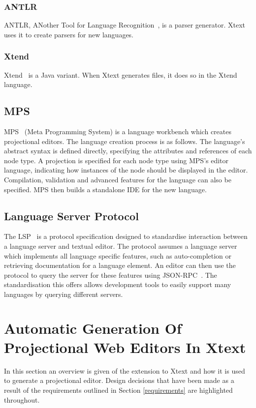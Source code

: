 \documentclass{article}
\begin{document}
\subsubsection{ANTLR}
ANTLR, ANother Tool for Language Recognition~\cite{antlr}, is a parser generator. Xtext uses it to create parsers for new languages.
\subsubsection{Xtend}
Xtend~\cite{xtend} is a Java variant. When Xtext generates files, it does so in the Xtend language.
\subsection{MPS}\label{mps}
MPS~\cite{mps} (Meta Programming System) is a language workbench which creates projectional editors. The language creation process is as follows. The language's abstract syntax is defined directly, specifying the attributes and references of each node type. A projection is specified for each node type using MPS's editor language, indicating how instances of the node should be displayed in the editor. Compilation, validation and advanced features for the language can also be specified. MPS then builds a standalone IDE for the new language. 
\subsection{Language Server Protocol}\label{lsp}
The LSP~\cite{lsp} is a protocol specification designed to standardise interaction between a language server and textual editor. The protocol assumes a language server which implements all language specific features, such as auto-completion or retrieving documentation for a language element. An editor can then use the protocol to query the server for these features using JSON-RPC~\cite{jsonrpc}. The standardisation this offers allows development tools to easily support many languages by querying different servers.
%
%
%
%
%
%
\section{Automatic Generation Of Projectional Web Editors In Xtext}\label{generation}
In this section an overview is given of the extension to Xtext and how it is used to generate a projectional editor. Design decisions that have been made as a result of the requirements outlined in Section \ref{requirements} are highlighted throughout. 
\end{document}
